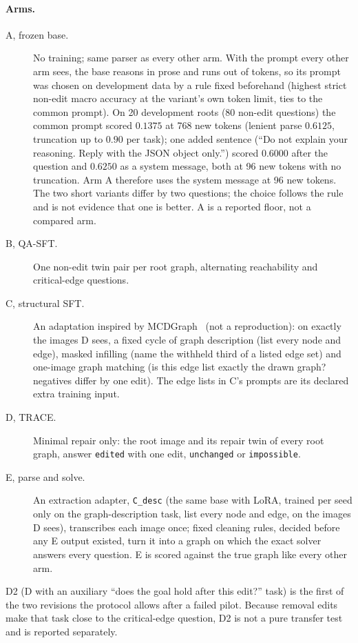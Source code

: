 \paragraph{Arms.}
\begin{description}
\item[A, frozen base.] No training; same parser as every other arm. With the prompt every
  other arm sees, the base reasons in prose and runs out of tokens, so its prompt was chosen on
  development data by a rule fixed beforehand (highest strict non-edit macro accuracy at the
  variant's own token limit, ties to the common prompt). On 20 development roots (80 non-edit
  questions) the common prompt scored $0.1375$ at 768 new tokens (lenient parse $0.6125$,
  truncation up to $0.90$ per task); one added sentence (``Do not explain your reasoning.
  Reply with the JSON object only.'') scored $0.6000$ after the question and $0.6250$ as a
  system message, both at 96 new tokens with no truncation. Arm A therefore uses the system
  message at 96 new tokens. The two short variants differ by two questions; the choice
  follows the rule and is not evidence that one is better. A is a reported floor, not a
  compared arm.
\item[B, QA-SFT.] One non-edit twin pair per root graph, alternating reachability and
  critical-edge questions.
\item[C, structural SFT.] An adaptation inspired by MCDGraph~\cite{mcdgraph} (not a
  reproduction): on exactly the images D sees, a fixed cycle of graph description (list every
  node and edge), masked infilling (name the withheld third of a listed edge set) and
  one-image graph matching (is this edge list exactly the drawn graph? negatives differ by one
  edit). The edge lists in C's prompts are its declared extra training input.
\item[D, TRACE.] Minimal repair only: the root image and its repair twin of every root
  graph, answer \texttt{edited} with one edit, \texttt{unchanged} or \texttt{impossible}.
\item[E, parse and solve.] An extraction adapter, \texttt{C\_desc} (the same base with LoRA,
  trained per seed only on the graph-description task, list every node and edge, on the images
  D sees), transcribes each image once; fixed cleaning rules, decided before any E output existed, turn it into a graph on which the exact
  solver answers every question. E is scored against the true graph like every other arm.
\end{description}
D2 (D with an auxiliary ``does the goal hold after this edit?'' task) is the first of the two
revisions the protocol allows after a failed pilot. Because removal edits make that task close
to the critical-edge question, D2 is not a pure transfer test and is reported separately.

